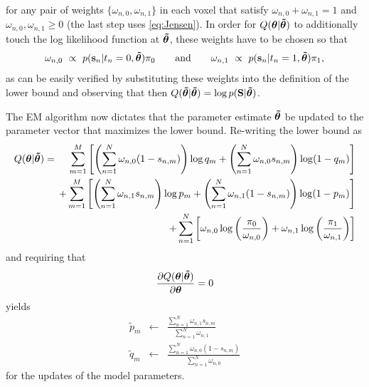 \documentclass[10pt,twoside]{book}
\begin{document}
for any pair of weights $\{\omega_{n,0}, \omega_{n,1}\}$ in each voxel that satisfy $\omega_{n,0}+\omega_{n,1}=1$ and $\omega_{n,0},\omega_{n,1} \geq 0$ (the last step uses \eqref{eq:Jensen}). In order for $Q({\mbox{\boldmath {${\theta}$}}} | {\mbox{\boldmath {${\tilde{\theta}}$}}})$
to additionally touch the log likelihood function at ${\mbox{\boldmath {${\tilde{\theta}}$}}}$, these weights have to be chosen so that
\begin{equation}
  \omega_{n,0} \,\, \propto \,\,p( \mathbf{s}_n | t_n=0, {\mbox{\boldmath {${\tilde{\theta}}$}}} ) \pi_0 \quad\quad \mathrm{and} \quad\quad \omega_{n,1} \,\,\propto \,\,p( \mathbf{s}_n | t_n=1, {\mbox{\boldmath {${\tilde{\theta}}$}}} ) \pi_1,
  \label{eq:stapleWeights}
\end{equation}
as can be easily verified by substituting these weights into the definition of the lower bound and observing that then $Q({\mbox{\boldmath {${\tilde{\theta}}$}}} | {\mbox{\boldmath {${\tilde{\theta}}$}}}) = \log p( \mathbf{S} | {\mbox{\boldmath {${\tilde{\theta}}$}}} )$.

The EM algorithm now dictates that the parameter estimate ${\mbox{\boldmath {${\tilde{\theta}}$}}}$ be updated to the parameter vector that maximizes the lower bound. Re-writing the lower bound 
as 
\begin{eqnarray}
  Q(\bldgr{\theta} | \bldgr{\tilde{\theta}}) & = & \hspace{-2mm} \phantom{+} \sum_{m=1}^M \left[ \left( \sum_{n=1}^N \omega_{n,0} (1-s_{n,m}) \right) \log q_m + \left( \sum_{n=1}^N \omega_{n,0} s_{n,m} \right) \log (1-q_m) \right] \nonumber \\
                                             &   & \hspace{-2mm}           + \sum_{m=1}^M \left[ \left( \sum_{n=1}^N \omega_{n,1} s_{n,m} \right) \log p_m  + \left( \sum_{n=1}^N \omega_{n,1} (1-s_{n,m}) \right) \log (1-p_m) \right] \nonumber \\
                                             &   & \hspace{-2mm}           + \sum_{n=1}^N \left[ \omega_{n,0} \log \left( \frac{\pi_0}{\omega_{n,0}} \right) + \omega_{n,1} \log \left( \frac{\pi_1}{\omega_{n,1}} \right) \right]
\end{eqnarray}
and requiring that
\begin{displaymath}
  \frac{\partial Q( {\mbox{\boldmath {${\theta}$}}} | {\mbox{\boldmath {${\tilde{\theta}}$}}} )}{ \partial {\mbox{\boldmath {${\theta}$}}}} = 0
\end{displaymath}
yields
\begin{eqnarray}
  \tilde{p}_m & \gets & \frac{\sum_{n=1}^N \omega_{n,1} s_{n,m}}{\sum_{n=1}^N \omega_{n,1}}     \label{eq:stapleSensitivityUpdate} \\
  \tilde{q}_m & \gets & \frac{\sum_{n=1}^N \omega_{n,0} (1-s_{n,m})}{\sum_{n=1}^N \omega_{n,0}} \label{eq:stapleSpecificityUpdate}
\end{eqnarray}
for the updates of the model parameters.
\end{document}
